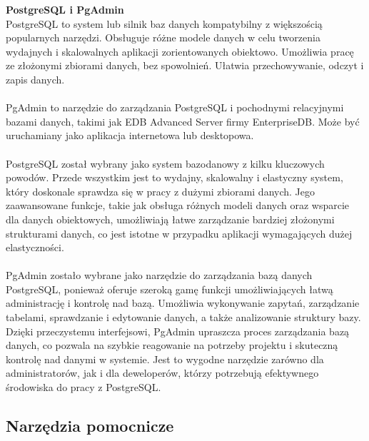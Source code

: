 \documentclass[twoside]{projektInzynierskiMS1}
\begin{document}
\noindent \textbf{PostgreSQL i PgAdmin}\\
PostgreSQL to system lub silnik baz danych kompatybilny z większością popularnych narzędzi. Obsługuje różne modele danych w celu tworzenia wydajnych i skalowalnych aplikacji zorientowanych obiektowo. Umożliwia pracę ze złożonymi zbiorami danych, bez spowolnień. Ułatwia przechowywanie, odczyt i zapis danych.
\\\\
PgAdmin to narzędzie do zarządzania PostgreSQL i pochodnymi relacyjnymi bazami danych, takimi jak EDB Advanced Server firmy EnterpriseDB. Może być uruchamiany jako aplikacja internetowa lub desktopowa.
\\\\
PostgreSQL został wybrany jako system bazodanowy z kilku kluczowych powodów. Przede wszystkim jest to wydajny, skalowalny i elastyczny system, który doskonale sprawdza się w pracy z dużymi zbiorami danych. Jego zaawansowane funkcje, takie jak obsługa różnych modeli danych oraz wsparcie dla danych obiektowych, umożliwiają łatwe zarządzanie bardziej złożonymi strukturami danych, co jest istotne w przypadku aplikacji wymagających dużej elastyczności.
\\\\
PgAdmin zostało wybrane jako narzędzie do zarządzania bazą danych PostgreSQL, ponieważ oferuje szeroką gamę funkcji umożliwiających łatwą administrację i kontrolę nad bazą. Umożliwia wykonywanie zapytań, zarządzanie tabelami, sprawdzanie i edytowanie danych, a także analizowanie struktury bazy. Dzięki przeczystemu interfejsowi, PgAdmin upraszcza proces zarządzania bazą danych, co pozwala na szybkie reagowanie na potrzeby projektu i skuteczną kontrolę nad danymi w systemie. Jest to wygodne narzędzie zarówno dla administratorów, jak i dla deweloperów, którzy potrzebują efektywnego środowiska do pracy z PostgreSQL.

\newpage

\subsection{Narzędzia pomocnicze}
\end{document}
